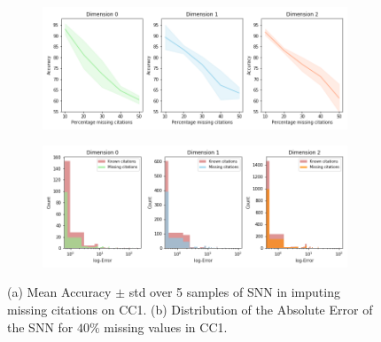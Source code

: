 \begin{figure}[tb]
\centering
 \begin{subfigure}[t]{-0.8\textwidth}
 \vspace{-4cm}
  \end{subfigure}
\begin{subfigure}[t]{0.8\textwidth}
\centering
   \includegraphics[scale=0.35]{./figures/accuracy_network1.png}
\end{subfigure}
 \begin{subfigure}[t]{0.8\textwidth}
  \end{subfigure}
\begin{subfigure}[t]{0.8\textwidth}
\centering
\vspace{-0.5cm}
   \includegraphics[scale=0.36]{./figures/Error_dist_start150250_seed6666_notsee40.png}
\end{subfigure}
\caption{(a) Mean Accuracy $\pm$ std over 5 samples of SNN in imputing missing citations on CC1. (b) Distribution of the Absolute Error of the SNN for $40\%$ missing values in CC1.   }
\label{fig:accuracy-error}
\end{figure}